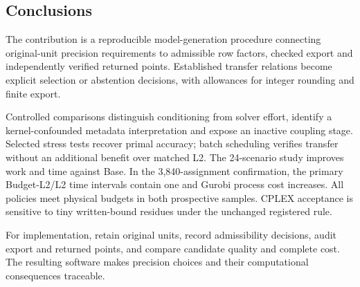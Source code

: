 \subsection{Conclusions}
The contribution is a reproducible model-generation procedure connecting
original-unit precision requirements to admissible row factors, checked export
and independently verified returned points. Established transfer relations
become explicit selection or abstention decisions, with allowances for integer
rounding and finite export.

Controlled comparisons distinguish conditioning from solver effort, identify a
kernel-confounded metadata interpretation and expose an inactive coupling stage.
Selected stress tests recover primal accuracy; batch scheduling verifies transfer
without an additional benefit over matched L2. The 24-scenario study improves
work and time against Base. In the 3,840-assignment confirmation, the primary
Budget-L2/L2 time intervals contain one and Gurobi process cost increases.
All policies meet physical budgets in both prospective samples. CPLEX acceptance
is sensitive to tiny written-bound residues under the unchanged registered rule.

For implementation, retain original units, record admissibility decisions,
audit export and returned points, and compare candidate quality and complete
cost. The resulting software makes precision choices and their computational
consequences traceable.
